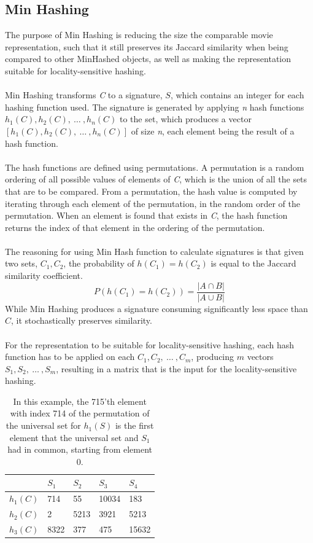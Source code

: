\subsection{Min Hashing}
The purpose of Min Hashing is reducing the size the comparable movie representation, such that it still preserves its Jaccard similarity when being compared to other MinHashed objects, as well as making the representation suitable for locality-sensitive hashing.\\ \\
Min Hashing transforms \textit{C} to a signature, \(S\), which contains an integer for each hashing function used. The signature is generated by applying \textit{n} hash functions \(h_1(C), h_2(C),\ \dots\ , h_n(C)\) to the set, which produces a vector \([h_1(C), h_2(C),\ \dots\ , h_n(C)]\) of size \textit{n}, each element being the result of a hash function.\\ \\
The hash functions are defined using permutations. A permutation is a random ordering of all possible values of elements of \textit{C}, which is the union of all the sets that are to be compared. From a permutation, the hash value is computed by iterating through each element of the permutation, in the random order of the permutation. When an element is found that exists in \textit{C}, the hash function returns the index of that element in the ordering of the permutation.\\ \\
The reasoning for using Min Hash function to calculate signatures is that given two sets, \(C_1, C_2\), the probability of \(h(C_1) = h(C_2)\) is equal to the Jaccard similarity coefficient.
\begin{equation}
P(h(C_1) = h(C_2)) = \frac{|A \cap B|}{|A \cup B|}
\end{equation}
While Min Hashing produces a signature consuming significantly less space than \(C\), it stochastically preserves similarity.\\ \\
For the representation to be suitable for locality-sensitive hashing, each hash function has to be applied on each \(C_1, C_2,\ \dots\ , C_m\), producing \(m\) vectors \(S_1, S_2,\ \dots\ , S_m\), resulting in a matrix that is the input for the locality-sensitive hashing.

\begin{table}[h]
\begin{tabular}{l||l|l|l|l}
& \(S_1\) & \(S_2\) & \(S_3\) & \(S_4\) \\ \hline \hline
\(h_1(C)\) & 714 & 55 & 10034 & 183 \\ \hline
\(h_2(C)\) & 2 & 5213 & 3921 & 5213 \\ \hline
\(h_3(C)\) & 8322 & 377 & 475 & 15632
\end{tabular}
\centering
\caption{In this example, the 715'th element with index 714 of the permutation of the universal set for \(h_1(S)\) is the first element that the universal set and \(S_1\) had in common, starting from element 0.}
\end{table}

